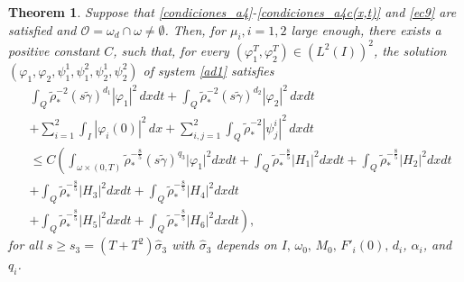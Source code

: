 \documentclass[11pt,a4paper]{amsart}
\numberwithin{equation}{section}
\newtheorem{theorem}{Theorem}[section]
\begin{document}
\begin{theorem}\label{Carleman-Theorem-2} 
Suppose that  \eqref{condiciones_a4}-\eqref{condiciones_a4c(x,t)} and  \eqref{ec9} are satisfied and   $\mathcal{O} =\omega_d\cap \omega \neq \emptyset$. Then, for $\mu_i, i=1,2$  large enough, there exists  a positive constant $C$, such that, for every $(\varphi_1^T,\varphi_2^T) \in (L^2(I))^2$, the  solution  $(\varphi_{1},\varphi_{2},\psi^{1}_{1},\psi^{2}_{1},\psi^{1}_{2},\psi^{2}_{2})$  of  system \eqref{ad1} satisfies
\begin{equation}\label{car_for_ad_ptipipri}
    \begin{split}
       & \int_{Q}\tilde{\rho}^{-2}_{*}(s\tilde{\gamma})^{d_1}|\varphi_1|^{2}\,dxdt+\int_{Q}\tilde{\rho}^{-2}_{*}(s\tilde{\gamma})^{d_2}|\varphi_2|^{2}\,dxdt\\
       &+\sum_{i=1}^{2}\int_{I}|\varphi_{i}(0)|^{2}\,dx+\sum_{i,j=1}^{2}\int_{Q}\tilde{\rho}^{-2}_{*}|\psi^{i}_{j}|^{2}\,dxdt\\
       &\leq C\left(\int_{\omega\times (0,T)}\tilde{\rho}^{-\frac{8}{5}}_{*}(s\tilde{\gamma})^{q_3}\vert \varphi_1 \vert^2dxdt +\int_{Q}\tilde{\rho}^{-\frac{8}{5}}_{*}\vert H_1\vert^2dxdt + \int_{Q}\tilde{\rho}^{-\frac{8}{5}}_{*}\vert H_2\vert^2dxdt\right.\\
       &	  + \int_{Q}\tilde{\rho}^{-\frac{8}{5}}_{*}\vert H_3\vert^2dxdt +\int_{Q}\tilde{\rho}^{-\frac{8}{5}}_{*} \vert H_{4}\vert^2  dxdt\\
       & \left.+\int_{Q}\tilde{\rho}^{-\frac{8}{5}}_{*} \vert H_{5}\vert^2  dxdt+\int_{Q}\tilde{\rho}^{-\frac{8}{5}}_{*} \vert H_{6}\vert^2  dxdt\right),
    \end{split}
\end{equation}for all $s\geq s_{3}=(T+T^{2})\hat{\sigma}_{3}$ with $\hat{\sigma}_{3}$ depends on  $I,\, \omega_{0},\, M_{0},\,  F'_i(0),\,  d_{i}$, $\alpha_{i}$,  and $q_{i}$.
\end{theorem}
\end{document}
